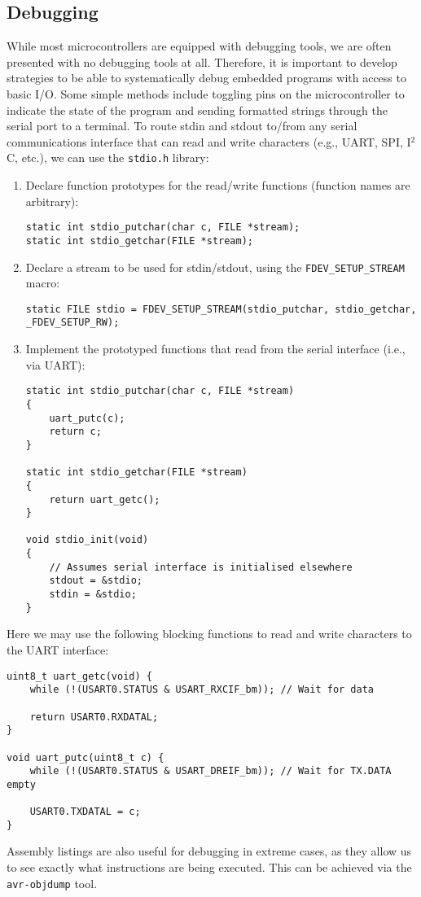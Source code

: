 \documentclass{article}
\begin{document}
\subsection{Debugging}
While most microcontrollers are equipped with debugging tools, we are
often presented with no debugging tools at all. Therefore, it is
important to develop strategies to be able to systematically debug
embedded programs with access to basic I/O. Some simple methods include
toggling pins on the microcontroller to indicate the state of the
program and sending formatted strings through the serial port to a
terminal. To route stdin and stdout to/from any serial communications
interface that can read and write characters (e.g., UART, SPI,
I\({}^2\)C, etc.), we can use the \texttt{stdio.h} library:
\begin{enumerate}
    \item Declare function prototypes for the read/write functions
          (function names are arbitrary):
          \begin{verbatim}
static int stdio_putchar(char c, FILE *stream);
static int stdio_getchar(FILE *stream);
    \end{verbatim}
    \item Declare a stream to be used for stdin/stdout, using the
          \texttt{FDEV_SETUP_STREAM} macro:
          \begin{verbatim}
static FILE stdio = FDEV_SETUP_STREAM(stdio_putchar, stdio_getchar, _FDEV_SETUP_RW);
\end{verbatim}
    \item Implement the prototyped functions that read from the serial
          interface (i.e., via UART):
          \begin{verbatim}
static int stdio_putchar(char c, FILE *stream)
{
    uart_putc(c);
    return c;
}

static int stdio_getchar(FILE *stream)
{
    return uart_getc();
}

void stdio_init(void)
{
    // Assumes serial interface is initialised elsewhere
    stdout = &stdio;
    stdin = &stdio;
}
    \end{verbatim}
\end{enumerate}
Here we may use the following blocking functions to read and write
characters to the UART interface:
\begin{verbatim}
uint8_t uart_getc(void) {
    while (!(USART0.STATUS & USART_RXCIF_bm)); // Wait for data

    return USART0.RXDATAL;
}

void uart_putc(uint8_t c) {
    while (!(USART0.STATUS & USART_DREIF_bm)); // Wait for TX.DATA empty

    USART0.TXDATAL = c;
}
\end{verbatim}
Assembly listings are also useful for debugging in extreme cases, as
they allow us to see exactly what instructions are being executed. This
can be achieved via the \texttt{avr-objdump} tool.
\end{document}
